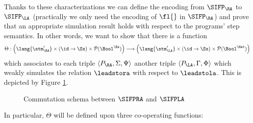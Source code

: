 Thanks to these characterizations we can define the encoding from
$\SIFP_\RA$ to $\SIFP_\LA$
(practically we only need the encoding of $\fl{}$ in $\SIFP_\RA$)
and prove that an appropriate simulation result holds with respect to
the programs' step semantics.
%
In other words, we want to show that there is a function
%
$$
\Theta: \left(\lang{\stm_\RA'}\times \left(\id\to{\Ss}\right)\times \mathcal P (\Bool^\Ss) \right)
\longrightarrow
\left(\lang{\stm_\LA'}\times \left(\id\to{\Ss}\right)\times \mathcal P (\Bool^\Nat) \right)
$$
%
which associates to each triple $\langle P_\RA, \Sigma, \Psi\rangle$ another triple
$\langle P_\LA, \Gamma, \Phi\rangle$ which weakly simulates the relation $\leadstora$
with respect to $\leadstola$. This is depicted by Figure \ref{fig:commutationsifp}.
%
\begin{figure}[]
  \caption{Commutation schema between $\SIFPRA$ and $\SIFPLA$}
  \label{fig:commutationsifp}
\end{figure}
%
In particular, $\Theta$ will be defined upon three co-operating functions:
%
